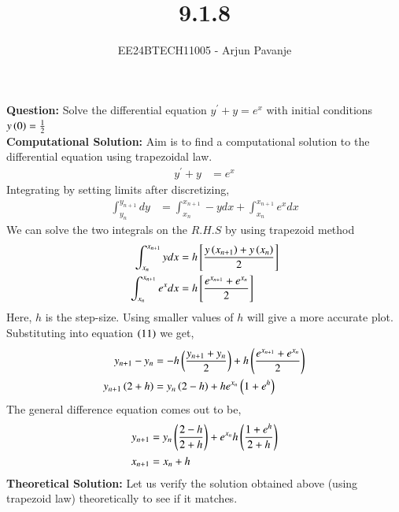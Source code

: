 \documentclass[journal]{IEEEtran}
\begin{document}

\vspace{3cm}

\title{9.1.8}
\author{EE24BTECH11005 - Arjun Pavanje}
{\let\newpage\relax\maketitle}
\textbf{Question:}
Solve the differential equation $y^{\prime}+y=e^x$ with initial conditions $y\left(0\right)=\frac{1}{2}$
\solution\\


\textbf{Computational Solution:}\newline
Aim is to find a computational solution to the differential equation using trapezoidal law.
\begin{align}
  y^{\prime}+y&=e^x
\end{align}
Integrating by setting limits after discretizing,
\begin{align}
  \int_{y_n}^{y_{n+1}}dy&=\int_{x_n}^{x_{n+1}}-y dx +\int_{x_n}^{x_{n+1}} e^x dx
\end{align}
We can solve the two integrals on the $R.H.S$ by using trapezoid method
\begin{align}
  \int_{x_n}^{x_{n+1}}ydx&= h{}\left[\frac{y\left(x_{n+1}\right)+y\left(x_n\right)}{2}\right]\\
  \int_{x_n}^{x_{n+1}}e^xdx&= h{}\left[\frac{e^{x_{n+1}}+e^{x_n} }{2}\right]
\end{align}
Here, $h$ is the step-size. Using smaller values of $h$ will give a more accurate plot. Substituting into equation $\left(11\right)$ we get,
\begin{align}
  y_{n+1}-y_{n}&=-h\left(\frac{y_{n+1}+y_{n}}{2}\right)+h\left(\frac{e^{x_{n+1}}+e^{x_n}}{2}\right)\\
  y_{n+1}\left(2+h\right)&=y_n\left(2-h\right)+he^{x_n}\left(1+e^h\right)
\end{align}
The general difference equation comes out to be,
\begin{align}
  y_{n+1}&=y_n\left(\frac{2-h}{2+h}\right)+e^{x_n}h\left(\frac{1+e^h}{2+h}\right)\\
  x_{n+1}&=x_n+h
\end{align}
\textbf{Theoretical Solution:}\newline
Let us verify the solution obtained above (using trapezoid law) theoretically to see if it matches. \newline
\end{document}
